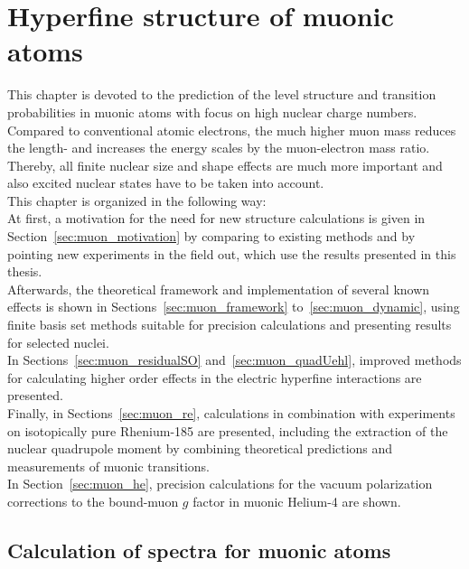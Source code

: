 \chapter{Hyperfine structure of muonic atoms}
\label{ch:muonic_atoms}
This chapter is devoted to the prediction of the level structure and transition probabilities in muonic atoms with focus on high nuclear charge numbers. Compared to conventional atomic electrons, the much higher muon mass reduces the length- and  increases the energy scales by the muon-electron mass ratio. Thereby, all finite nuclear size and shape effects are much more important and also excited nuclear states have to be taken into account.\\
This chapter is organized in the following way:\\
At first, a motivation for the need for new structure calculations is given in Section~\ref{sec:muon_motivation} by comparing to existing methods and by pointing new experiments in the field out, which use the results presented in this thesis.\\
Afterwards, the theoretical framework and implementation of several known effects is shown in Sections~\ref{sec:muon_framework} to~\ref{sec:muon_dynamic}, using finite basis set methods suitable for precision calculations and presenting results for selected nuclei.\\
In Sections~\ref{sec:muon_residualSO} and~\ref{sec:muon_quadUehl}, improved methods for calculating higher order effects in the electric hyperfine interactions are presented.\\
Finally, in Sections~\ref{sec:muon_re}, calculations in combination with experiments on isotopically pure Rhenium-185 are presented, including the extraction of the nuclear quadrupole moment by combining theoretical predictions and measurements of muonic transitions. \\
In Section~\ref{sec:muon_he}, precision calculations for the vacuum polarization corrections to the bound-muon $g$ factor in muonic Helium-4 are shown.

\section{Calculation of spectra for muonic atoms}
\label{sec:calculationSpectraMuon}
